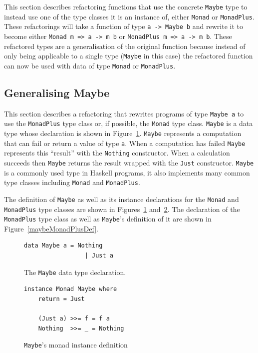 This section describes refactoring functions that use the concrete \texttt{Maybe} type to instead use one of the type classes it is an instance of, either \texttt{Monad} or \texttt{MonadPlus}. These refactorings will take a function of type \texttt{a -> Maybe b} and rewrite it to become either \texttt{Monad m => a -> m b} or \texttt{MonadPlus m => a -> m b}. These refactored types are a generalisation of the original function because instead of only being applicable to a single type (\texttt{Maybe} in this case) the refactored function can now be used with data of type \texttt{Monad} or \texttt{MonadPlus}.

\subsection{Generalising Maybe}

This section describes a refactoring that rewrites programs of type \texttt{Maybe a} to use the \texttt{MonadPlus} type class or, if possible, the \texttt{Monad} type class. \texttt{Maybe} is a data type whose declaration is shown in Figure~\ref{maybeDecl}. \texttt{Maybe} represents a computation that can fail or return a value of type \texttt{a}. When a computation has failed \texttt{Maybe} represents this ``result'' with the \texttt{Nothing} constructor. When a calculation succeeds then \texttt{Maybe} returns the result wrapped with the \texttt{Just} constructor. \texttt{Maybe} is a commonly used type in Haskell programs, it also implements many common type classes including \texttt{Monad} and \texttt{MonadPlus}. 

The definition of \texttt{Maybe} as well as its instance declarations for the \texttt{Monad} and \texttt{MonadPlus} type classes are shown in Figures~\ref{maybeDecl} and~\ref{maybeMonadDef}. The declaration of the \texttt{MonadPlus} type class as well as \texttt{Maybe}'s definition of it are shown in Figure~\ref{maybeMonadPlusDef}.

\begin{figure}[t]
\begin{lstlisting}
data Maybe a = Nothing
                 | Just a
\end{lstlisting}
\caption{The \texttt{Maybe} data type declaration.}
\label{maybeDecl}
\end{figure}

\begin{figure}[t]
\begin{lstlisting}   
instance Monad Maybe where
	return = Just
	
	(Just a) >>= f = f a
	Nothing  >>= _ = Nothing
\end{lstlisting}
\caption{\texttt{Maybe}'s monad instance definition}
\label{maybeMonadDef}
\end{figure}

